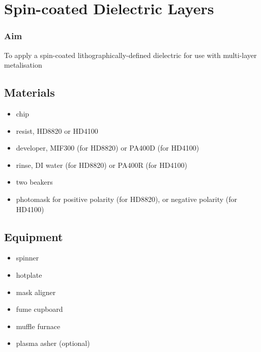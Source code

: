 
\section{Spin-coated Dielectric Layers}
\label{sec:photodielectrics}

\subsubsection{Aim}
To apply a spin-coated lithographically-defined dielectric for use with multi-layer metalisation

\subsection{Materials}
\begin{itemize}[noitemsep]
	\item chip
	\item resist, HD8820 or HD4100
	\item developer, MIF300 (for HD8820) or PA400D (for HD4100)
	\item rinse, DI water (for HD8820) or PA400R (for HD4100)
	\item two beakers
	\item photomask for positive polarity (for HD8820), or negative polarity (for HD4100)
\end{itemize}

\subsection{Equipment}
\begin{itemize}[noitemsep]
	\item spinner
	\item hotplate
	\item mask aligner
	\item fume cupboard
	\item muffle furnace
	\item plasma asher (optional)
\end{itemize}

